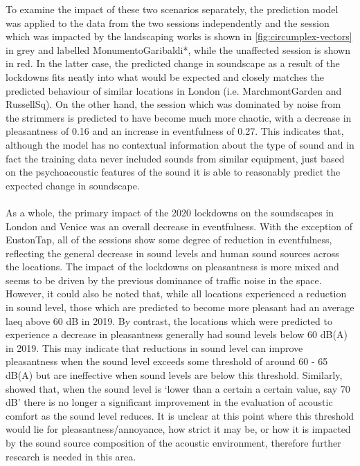    To examine the impact of these two scenarios separately, the prediction model was applied to the data from the two sessions independently and the session which was impacted by the landscaping works is shown in \cref{fig:circumplex-vectors} in grey and labelled MonumentoGaribaldi*, while the unaffected session is shown in red. In the latter case, the predicted change in soundscape as a result of the lockdowns fits neatly into what would be expected and closely matches the predicted behaviour of similar locations in London (i.e. MarchmontGarden and RussellSq). On the other hand, the session which was dominated by noise from the strimmers is predicted to have become much more chaotic, with a decrease in pleasantness of 0.16 and an increase in eventfulness of 0.27. This indicates that, although the model has no contextual information about the type of sound and in fact the training data never included sounds from similar equipment, just based on the psychoacoustic features of the sound it is able to reasonably predict the expected change in soundscape.

   \paragraph*{}As a whole, the primary impact of the 2020 lockdowns on the soundscapes in London and Venice was an overall decrease in eventfulness. With the exception of EustonTap, all of the sessions show some degree of reduction in eventfulness, reflecting the general decrease in sound levels and human sound sources across the locations. The impact of the lockdowns on pleasantness is more mixed and seems to be driven by the previous dominance of traffic noise in the space. However, it could also be noted that, while all locations experienced a reduction in sound level, those which are predicted to become more pleasant had an average \gls{laeq} above 60 dB in 2019. By contrast, the locations which were predicted to experience a decrease in pleasantness generally had sound levels below 60 dB(A) in 2019. This may indicate that reductions in sound level can improve pleasantness when the sound level exceeds some threshold of around 60 - 65 dB(A) but are ineffective when sound levels are below this threshold. Similarly, \citet{Yang2005Acoustic} showed that, when the sound level is `lower than a certain a certain value, say 70 dB' there is no longer a significant improvement in the evaluation of acoustic comfort as the sound level reduces. It is unclear at this point where this threshold would lie for pleasantness/annoyance, how strict it may be, or how it is impacted by the sound source composition of the acoustic environment, therefore further research is needed in this area.

